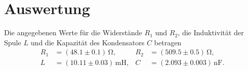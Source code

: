 \section{Auswertung}
Die angegebenen Werte für die Widerstände $R_1$ und $R_2$, die Induktivität der Spule $L$ und die Kapazität des Kondensators $C$ betragen
\begin{align*}
    R_1 &= (\num[]{48.1} \pm \num[]{0.1}) \, \unit{\ohm}, & R_2 &= (\num[]{509.5} \pm \num[]{0.5}) \, \unit{\ohm}, \\
    L &= (\num[]{10.11} \pm \num[]{0.03}) \, \unit{\milli \henry}, & C &= (\num[]{2.093} \pm \num[]{0.003}) \, \unit{\nano \farad}.
\end{align*}





